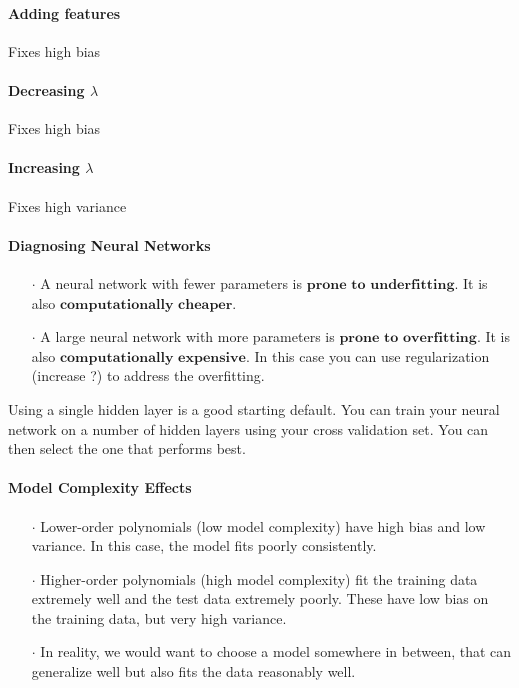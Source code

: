 \documentclass[UTF8]{article}
\begin{document}
\paragraph{Adding features} Fixes high bias
\paragraph{Decreasing $\lambda$} Fixes high bias
\paragraph{Increasing $\lambda$} Fixes high variance

\paragraph{Diagnosing Neural Networks}

\begin{itemize}
\item[$\cdot$]A neural network with fewer parameters is $\textbf{prone to underfitting}$. It is also $\textbf{computationally cheaper}$.
\item[$\cdot$]A large neural network with more parameters is $\textbf{prone to overfitting}$. It is also $\textbf{computationally expensive}$. In this case you can use regularization (increase ?) to address the overfitting.
\end{itemize}

Using a single hidden layer is a good starting default. You can train your neural network on a number of hidden layers using your cross validation set. You can then select the one that performs best.

\paragraph{Model Complexity Effects}

\begin{itemize}
\item[$\cdot$]Lower-order polynomials (low model complexity) have high bias and low variance. In this case, the model fits poorly consistently.
\item[$\cdot$]Higher-order polynomials (high model complexity) fit the training data extremely well and the test data extremely poorly. These have low bias on the training data, but very high variance.
\item[$\cdot$]In reality, we would want to choose a model somewhere in between, that can generalize well but also fits the data reasonably well.
\end{itemize}
\end{document}
